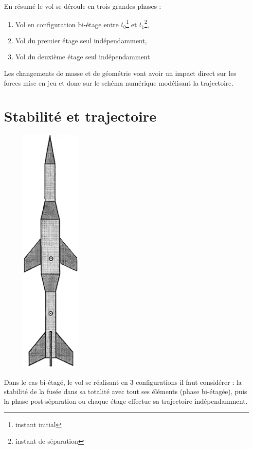 \documentclass[a4paper]{article}
\begin{document}
En résumé le vol se déroule en trois grandes phases : 

\begin{enumerate}

\item Vol en configuration bi-étage entre $t_{0}$\footnote{instant initial} et $t_{1}$\footnote{instant de séparation},
\item Vol du premier étage seul indépendamment,
\item Vol du deuxième étage seul indépendamment

\end{enumerate}



Les changements de masse et de géométrie vont avoir un impact direct sur les forces mise en jeu et donc sur le schéma numérique modélisant la trajectoire.


\section{Stabilité et trajectoire}


\begin{figure}

\includegraphics[width=3cm]{pictures/bietage.png}
\end{figure}

Dans le cas bi-étagé, le vol se réalisant en 3 configurations il faut considérer : la
stabilité de la fusée dans sa totalité avec tout ses éléments (phase bi-étagée), puis la phase post-séparation ou
chaque étage effectue sa trajectoire indépendamment.\\
\end{document}

